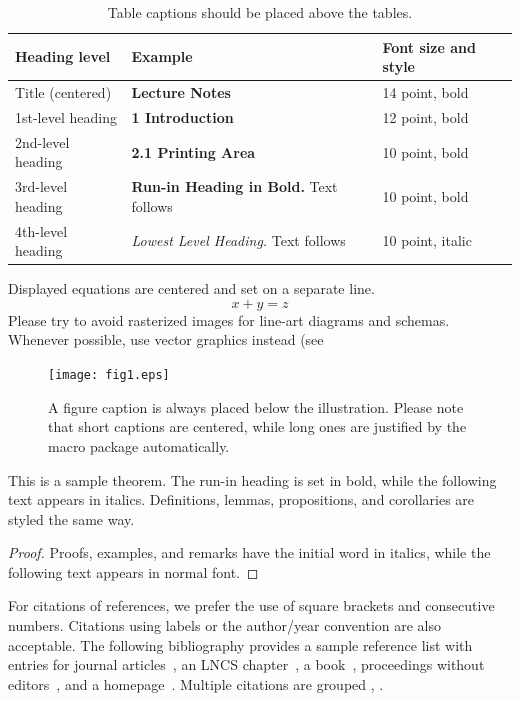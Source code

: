 \documentclass[runningheads]{llncs}
\begin{document}

\begin{table}
\caption{Table captions should be placed above the
tables.}\label{tab1}
\begin{tabular}{|l|l|l|}
\hline
Heading level &  Example & Font size and style\\
\hline
Title (centered) &  {\Large\bfseries Lecture Notes} & 14 point, bold\\
1st-level heading &  {\large\bfseries 1 Introduction} & 12 point, bold\\
2nd-level heading & {\bfseries 2.1 Printing Area} & 10 point, bold\\
3rd-level heading & {\bfseries Run-in Heading in Bold.} Text follows & 10 point, bold\\
4th-level heading & {\itshape Lowest Level Heading.} Text follows & 10 point, italic\\
\hline
\end{tabular}
\end{table}


\noindent Displayed equations are centered and set on a separate
line.
\begin{equation}
x + y = z
\end{equation}
Please try to avoid rasterized images for line-art diagrams and
schemas. Whenever possible, use vector graphics instead (see

\begin{figure}
\texttt{[image: fig1.eps]}
\caption{A figure caption is always placed below the illustration.
Please note that short captions are centered, while long ones are
justified by the macro package automatically.} \label{fig1}
\end{figure}

\begin{theorem}
This is a sample theorem. The run-in heading is set in bold, while
the following text appears in italics. Definitions, lemmas,
propositions, and corollaries are styled the same way.
\end{theorem}
%
%
\begin{proof}
Proofs, examples, and remarks have the initial word in italics,
while the following text appears in normal font.
\end{proof}
For citations of references, we prefer the use of square brackets
and consecutive numbers. Citations using labels or the author/year
convention are also acceptable. The following bibliography provides
a sample reference list with entries for journal
articles~\cite{ref_article1}, an LNCS chapter~\cite{ref_lncs1}, a
book~\cite{ref_book1}, proceedings without editors~\cite{ref_proc1},
and a homepage~\cite{ref_url1}. Multiple citations are grouped
\cite{ref_article1,ref_lncs1,ref_book1},
\cite{ref_article1,ref_book1,ref_proc1,ref_url1}.
\end{document}
